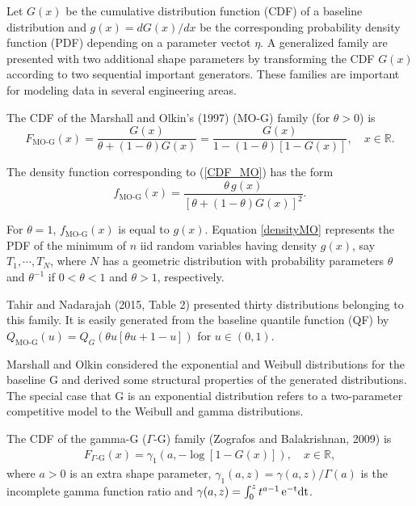 \documentclass[12pt,a4paper]{article} %
\begin{document}
Let $G(x)$ be the cumulative distribution function (CDF) of a
baseline distribution and $g(x)=dG(x)/dx$ be the corresponding  probability density function (PDF) depending on a
parameter vectot $\eta$. A generalized family are presented
with two additional shape parameters by transforming the CDF $G(x)$
according to two sequential important gene\-rators. These families are important for modeling data
in several engineering areas. 


The CDF of the Marshall and Olkin's (1997) ($\text{MO-G}$) family (for $\theta>0$) is
\begin{equation}\label{CDF_MO}
F_{\text{MO-G}}(x)=\frac{G(x)}{\theta+(1-\theta)G(x)}=\frac{G(x)}{1-(1-\theta)[1-G(x)]},\quad x \in \mathbb{R}.
\end{equation}

The density function corresponding to (\ref{CDF_MO}) has the form
\begin{equation}\label{densityMO}
f_{\text{MO-G}}(x)=\frac{\theta\, g(x)}{[\theta+(1-\theta)G(x)]^{2}}.
\end{equation}

For $\theta=1$, $f_{\text{MO-G}}(x)$ is equal to $g(x)$. 
Equation \eqref{densityMO} represents the PDF of the minimum of $n$ iid random variables having density $g(x)$, say $T_1,\cdots,T_N$, 
where $N$ has a geometric distribution with probability parameters $\theta$ and $\theta^{-1}$ if $0<\theta<1$ and $\theta>1$, 
respectively.

Tahir and Nadarajah (2015, Table 2) presented thirty distributions
belonging to this family. It is easily generated from the baseline quantile function (QF) by
$Q_{\text{MO-G}}(u)=Q_{G}\left(\theta u \left[\theta u+1-u\right]\right)$ for $u\in(0,1)$.

Marshall and Olkin considered the exponential and Weibull distributions for the baseline G and derived some
structural properties of the generated distributions. The special case that G is an exponential distribution
refers to a two-parameter competitive model to the Weibull and gamma distributions.

The CDF of the gamma-G ($\Gamma$-G) family (Zografos and Balakrishnan, 2009) is
\begin{eqnarray}\label{CDF_Ga}
F_{\Gamma\text{-G}}(x)=\gamma_1\left( a, -\log \left[1-G(x)\right]\right), \quad x \in \mathbb{R},
\end{eqnarray}
where $a>0$ is an extra shape parameter,  $\gamma_1(a,z)= \gamma(a,z)/\Gamma(a)$ is the incomplete gamma function ratio
and $\gamma(a,z)=\int_0^{z} t^{a-1}\,\rm{e}^{-t}dt$.
\end{document}
